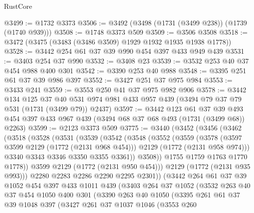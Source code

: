 \begin{lexlean}{RustCore}
\begin{coremodule}
@3499 := @1732 @3373
@3506 := @3492 (@3498 (@1731 (@3499 @238)) (@1739 (@1740 @939)))
@3508 := @1748 @3373 @509
@3509 := @3506 @3508
@3518 := @3472 (@3475 (@3483 (@3486 @3509) @1929 @1932 @1935 @1938 @1778))
@3528 := @3442 @254 @61 @37 @39 @990 @454 @397 @433 @949 @439
@3531 := @3403 @254 @37 @990
@3532 := @3408 @23
@3539 := @3532 @253 @40 @37 @454 @988 @400 @301
@3542 := @3390 @253 @40 @988
@3548 := @3395 @251 @61 @37 @39 @986 @397
@3552 := @3427 @251 @37 @975 @984
@3553 := @3433 @241
@3559 := @3553 @250 @41 @37 @975 @982 @906
@3578 := @3442
    @134
    @125
    @37
    @40
    @531
    @974
    @981
    @433
    @957
    @439
    (@3494 @79 @37 @79 @531 (@1731 (@3499 @79)) @2437)
@3597 := @3442
    @123
    @61
    @37
    @39
    @493
    @454
    @397
    @433
    @967
    @439
    (@3494 @68 @37 @68 @493 (@1731 (@3499 @68)) @2263)
@3599 := @2123 @3373 @509
@3775 := @3440
    (@3452
      (@3456
        (@3462
          (@3518
            (@3528
              (@3531
                (@3539
                  (@3542
                    (@3548
                      (@3552
                        (@3559
                          (@3578
                            (@3597 @3599 @2129 (@1772 (@2131 @968 @454)))
                            @2129
                            (@1772 (@2131 @958 @974)))
                          @3340
                          @3343
                          @3346
                          @3350
                          @3355
                          @3361))
                      @3508))
                  @1755
                  @1759
                  @1763
                  @1770
                  @1778))
              @3599
              @2129
              (@1772 (@2131 @950 @454)))
            @2129
            (@1772 (@2131 @935 @993)))
          @2280
          @2283
          @2286
          @2290
          @2295
          @2301))
      (@3442
        @264
        @61
        @37
        @39
        @1052
        @454
        @397
        @433
        @1011
        @439
        (@3403
          @264
          @37
          @1052
          (@3532
            @263
            @40
            @37
            @454
            @1050
            @400
            @301
            (@3390
              @263
              @40
              @1050
              (@3395
                @261
                @61
                @37
                @39
                @1048
                @397
                (@3427
                  @261
                  @37
                  @1037
                  @1046
                  (@3553
                    @260

\end{coremodule}
\end{lexlean}
